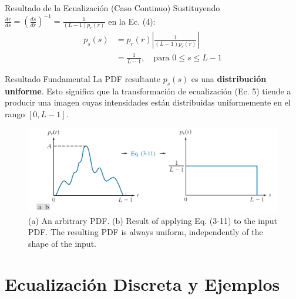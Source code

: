 \documentclass{beamer}
\begin{document}
\begin{frame}{Resultado de la Ecualización (Caso Continuo)}\footnotesize
  Sustituyendo $\frac{dr}{ds} = \left(\frac{ds}{dr}\right)^{-1} = \frac{1}{(L-1)p_r(r)}$ en la Ec. (4):
  \begin{align}
    p_s(s) &= p_r(r) \left| \frac{1}{(L-1)p_r(r)} \right| \nonumber \\
           &= \frac{1}{L-1}, \quad \text{para } 0 \le s \le L-1
  \end{align}
  \begin{block}{\footnotesize{Resultado Fundamental}}
    La PDF resultante $p_s(s)$ es una \textbf{distribución uniforme}. Esto significa que la transformación de ecualización (Ec. 5) tiende a producir una imagen cuyas intensidades están distribuidas uniformemente en el rango $[0, L-1]$.
  \end{block}
  \begin{figure}
      \centering
      \includegraphics[width=0.55\linewidth]{figuras/Fig_3_18.png}
  \caption{\footnotesize{(a) An arbitrary PDF. (b) Result of applying Eq. (3-11) to the input PDF. The resulting PDF is always uniform, independently of the shape of the input.}}
  \end{figure}
\end{frame}

\section{Ecualización Discreta y Ejemplos}
\end{document}
